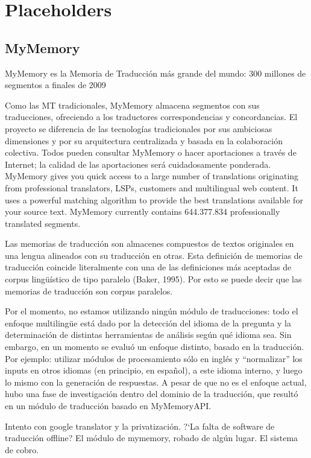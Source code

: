 
\chapter{Placeholders}
\section{MyMemory}
MyMemory es la Memoria de Traducción más grande del mundo: 300 millones de segmentos a finales de 2009

Como las MT tradicionales, MyMemory almacena segmentos con sus traducciones, ofreciendo a los traductores correspondencias y concordancias. El proyecto se diferencia de las tecnologías tradicionales por sus ambiciosas dimensiones y por su arquitectura centralizada y basada en la colaboración colectiva. Todos pueden consultar MyMemory o hacer aportaciones a través de Internet; la calidad de las aportaciones será cuidadosamente ponderada.
MyMemory gives you quick access to a large number of translations originating from professional translators, LSPs, customers and multilingual web content. It uses a powerful matching algorithm to provide the best translations available for your source text. MyMemory currently contains 644.377.834 professionally translated segments.

Las memorias de traducción son almacenes compuestos de textos originales en una lengua alineados con su traducción en otras. Esta definición de memorias de traducción coincide literalmente con una de las definiciones más aceptadas de corpus lingüístico de tipo paralelo (Baker, 1995). Por esto se puede decir que las memorias de traducción son corpus paralelos.


Por el momento, no estamos utilizando ningún módulo de traducciones:
todo el enfoque multilingüe está dado por la detección del idioma
de la pregunta y la determinación de distintas herramientas de
análisis según qué idioma sea. Sin embargo, en un momento se
evaluó un enfoque distinto, basado en la traducción. Por ejemplo:
utilizar módulos de procesamiento sólo en inglés y
{\textquotedblleft}normalizar{\textquotedblright} los inputs en otros
idiomas (en principio, en espa\~nol), a este idioma interno, y luego lo
mismo con la generación de respuestas. A pesar de que no es el
enfoque actual, hubo una fase de investigación dentro del dominio de
la traducción, que resultó en un módulo de traducción basado en
MyMemoryAPI.

Intento con google translator y la privatización. ?`La falta de
software de traducción offline? El módulo de mymemory, robado de
algún lugar. El sistema de cobro. 

